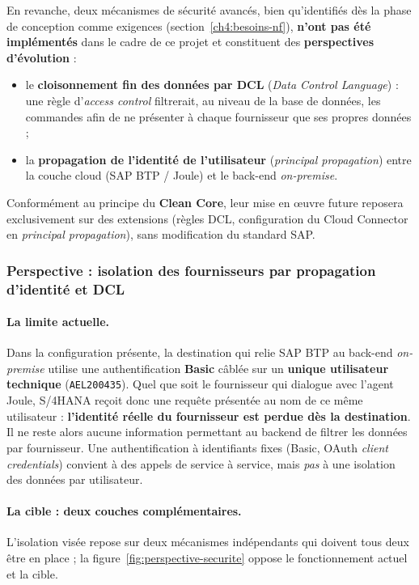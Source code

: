\documentclass[12pt,a4paper,oneside]{report}
\begin{document}
En revanche, deux mécanismes de sécurité avancés, bien qu'identifiés dès la phase de
conception comme exigences (section~\ref{ch4:besoins-nf}), \textbf{n'ont pas été
implémentés} dans le cadre de ce projet et constituent des \textbf{perspectives
d'évolution} :

\begin{itemize}[label=---, itemsep=0.2em]
    \item le \textbf{cloisonnement fin des données par DCL} (\textit{Data Control
    Language}) : une règle d'\textit{access control} filtrerait, au niveau de la base de
    données, les commandes afin de ne présenter à chaque fournisseur que ses propres
    données ;
    \item la \textbf{propagation de l'identité de l'utilisateur} (\textit{principal
    propagation}) entre la couche cloud (SAP BTP / Joule) et le back-end
    \textit{on-premise}.
\end{itemize}

Conformément au principe du \textbf{Clean Core}, leur mise en \oe uvre future reposera
exclusivement sur des extensions (règles DCL, configuration du Cloud Connector en
\textit{principal propagation}), sans modification du standard SAP.

\subsubsection{Perspective : isolation des fournisseurs par propagation d'identité et DCL}\label{ch5:perspective-secu}

\paragraph{La limite actuelle.} Dans la configuration présente, la destination qui relie
SAP BTP au back-end \textit{on-premise} utilise une authentification \textbf{Basic} câblée
sur un \textbf{unique utilisateur technique} (\texttt{AEL200435}). Quel que soit le
fournisseur qui dialogue avec l'agent Joule, S/4HANA reçoit donc une requête présentée au
nom de ce même utilisateur : \textbf{l'identité réelle du fournisseur est perdue dès la
destination}. Il ne reste alors aucune information permettant au backend de filtrer les
données par fournisseur. Une authentification à identifiants fixes (Basic, OAuth
\textit{client credentials}) convient à des appels de service à service, mais \emph{pas}
à une isolation des données par utilisateur.

\paragraph{La cible : deux couches complémentaires.} L'isolation visée repose sur deux
mécanismes indépendants qui doivent tous deux être en place ; la
figure~\ref{fig:perspective-securite} oppose le fonctionnement actuel et la cible.
\end{document}
